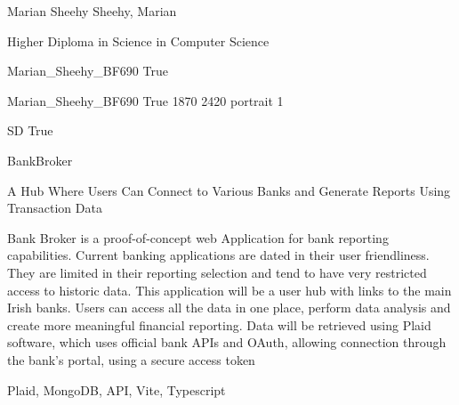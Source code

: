 
\begingroup{}\relax



\def\Key{Marian_Sheehy_BF690}

{Marian Sheehy}
{Sheehy, Marian}

{Higher Diploma in Science in Computer Science}

{Marian_Sheehy_BF690}
{True}

{Marian_Sheehy_BF690}
{True}
{1870}
{2420}
{portrait}
{1}

{SD}
{True}

{BankBroker}

{A Hub Where Users Can Connect to Various Banks and Generate Reports Using Transaction Data}

{Bank Broker is a proof-of-concept web Application for bank reporting capabilities. Current banking applications are dated in their user friendliness. They are limited in their reporting selection and tend to have very restricted access to historic data. This application will be a user hub with links to the main Irish banks. Users can access all the data in one place, perform data analysis and create more meaningful financial reporting. Data will be retrieved using Plaid software, which uses official bank APIs and OAuth, allowing connection through the bank's portal, using a secure access token}

{Plaid, MongoDB, API, Vite, Typescript}

